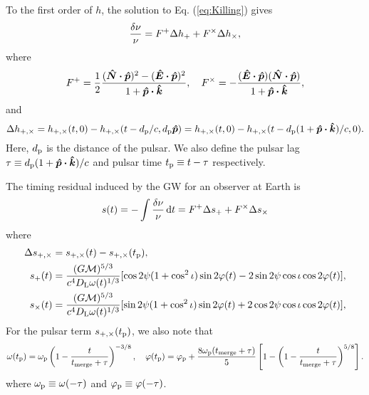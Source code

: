 \documentclass[times,tight]{aastex631}
\begin{document}
To the first order of $h$, the solution to Eq. (\ref{eq:Killing}) gives
\begin{equation}
    \frac{\var{\nu}}{\nu}
    = F^+ \Delta h_+ + F^{\times}\Delta h_{\times},
\end{equation}
where
\begin{equation}
    F^+ = \frac{1}{2} \frac{(\vu*{N}\vdot\vu*{p})^2 - (\vu*{E}\vdot\vu*{p})^2}{1 + \vu*{p}\vdot\vu*{k}} \qc
    F^{\times} = -\frac{(\vu*{E}\vdot\vu*{p})(\vu*{N}\vdot\vu*{p})}{1 + \vu*{p}\vdot\vu*{k}},
\end{equation}
and
\begin{equation}
    \Delta h_{+,\times} =  h_{+,\times}(t,0) - h_{+,\times}(t - d_{\rm p}/c, d_{\rm p}\vu*{p}) = h_{+,\times}(t,0) - h_{+,\times}(t - d_{\rm p}(1+\vu*{p}\vdot\vu*{k})/c,0).
\end{equation}
Here, $d_{\rm p}$ is the distance of the pulsar.
We also define the pulsar lag $\tau \equiv d_{\rm p}(1+\vu*{p}\vdot\vu*{k})/c$ and pulsar time $t_{\rm p} \equiv t - \tau$ respectively.

The timing residual induced by the GW for an observer at Earth is
\begin{equation}
    s(t) = -\int \frac{\var{\nu}}{\nu} \dd{t} = F^+ \Delta s_+ + F^{\times}\Delta s_{\times}
\end{equation}
where
\begin{align}
    \Delta s_{+,\times} &= s_{+,\times}(t) -  s_{+,\times}(t_{\rm p}), \nonumber \\
    s_{+}(t) &= \frac{(G\mathcal{M})^{5/3}}{c^4D_{\rm L}\omega(t)^{1/3}} [\cos2\psi(1+\cos^2\iota)\sin2\varphi(t) - 2\sin2\psi \cos\iota \cos 2\varphi(t)], \nonumber \\
    s_{\times}(t) &= \frac{(G\mathcal{M})^{5/3}}{c^4D_{\rm L}\omega(t)^{1/3}} [\sin2\psi(1+\cos^2\iota)\sin2\varphi(t) + 2\cos2\psi \cos\iota \cos 2\varphi(t)],
\end{align}
For the pulsar term $s_{+,\times}(t_{\rm p})$, we also note that
\begin{equation}
    \omega(t_{\rm p}) = \omega_{\rm p} \left(1 - \frac{t}{t_{\rm merge} + \tau}\right)^{-3/8} \qc
    \varphi(t_{\rm p}) = \varphi_{\rm p} + \frac{8\omega_{\rm p}(t_{\rm merge} + \tau)}{5} \left[1-\left(1-\frac{t}{t_{\rm merge}+\tau}\right)^{5/8}\right].
\end{equation}
where $\omega_{\rm p} \equiv \omega(-\tau)$ and $\varphi_{\rm p} \equiv \varphi(-\tau)$.
\end{document}
